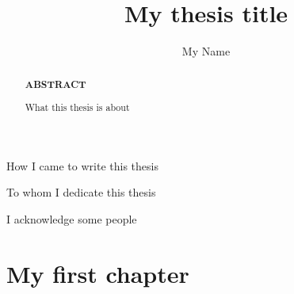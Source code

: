 \documentclass[phd,draft]{cornell}
\title {My thesis title}
\author {My Name}
\begin{document}
\maketitle 
\makecopyright


\begin{abstract}
\centerline{\textbf{ABSTRACT}} %
What this thesis is about
\end{abstract}


\begin{biosketch}
How I came to write this thesis
\end{biosketch}


\begin{dedication}
To whom I dedicate this thesis
\end{dedication}

\begin{acknowledgements}
I acknowledge some people
\end{acknowledgements}


\contentspage
\tablelistpage
\figurelistpage %

\normalspacing \setcounter{page}{1} 
\pagestyle{cornell} \addtolength{\parskip}{0.5\baselineskip}


%


\chapter{My first chapter}
\label{Intro}
\end{document}
